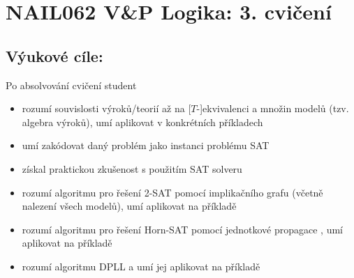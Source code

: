 \documentclass[a4paper,11pt]{amsart}
\begin{document}
\section*{NAIL062 V\&P Logika: 3. cvičení}



\subsection*{Výukové cíle:} Po absolvování cvičení student

    \begin{itemize}\setlength{\itemsep}{0pt}
        \item rozumí souvislosti výroků/teorií až na [$T$-]ekvivalenci a množin modelů (tzv. algebra výroků), umí aplikovat v konkrétních příkladech
        \item umí zakódovat daný problém jako instanci problému SAT
        \item získal praktickou zkušenost s použitím SAT solveru
        \item rozumí algoritmu pro řešení 2-SAT pomocí implikačního grafu (včetně nalezení všech modelů), umí aplikovat na příkladě
        \item rozumí algoritmu pro řešení Horn-SAT pomocí jednotkové propagace , umí aplikovat na příkladě
        \item rozumí algoritmu DPLL a umí jej aplikovat na příkladě
    \end{itemize}
    
\end{document}
